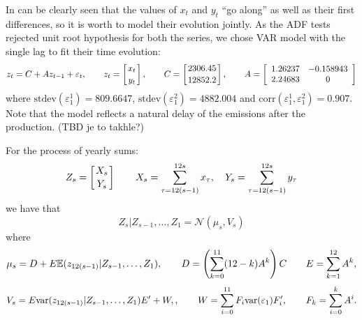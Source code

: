 \documentclass[3p,times]{elsarticle}
\begin{document}
In can be clearly seen that the values of $x_t$ and $y_t$ ``go along'' as well as their first differences, so it is worth to model their evolution jointly. As the ADF tests rejected unit root hypothesis for both the series, we chose VAR model with the single lag to fit their time evolution:
\begin{equation}\label{xymodel}
z_t=C + A z_{t-1} + \varepsilon_t,\qquad 
z_t = \left[x_t \atop y_t\right],
\qquad C = \left[2306	.45\atop 12852.2\right],
\qquad 
A=\left[\begin{array}{cc}
1.26237 &  -0.158943\\
2.24683 & 0 
\end{array}\right]
\end{equation}
where $\mathrm{stdev}(\varepsilon^1_1)=809.6647$, $\mathrm{stdev}(\varepsilon^2_1)=4882.004$ and $\mathrm{corr}(\varepsilon^1_1,\varepsilon^2_1)=0.907$.  Note that the model reflects a natural delay of the emissions after the production. (TBD je to takhle?)

For the process of yearly sums:
$$
Z_s = \left[X_s\atop Y_s\right]
\qquad 
X_s = \sum_{\tau = 12(s-1)}^{12s} x_\tau,
\quad
Y_s =\sum_{\tau = 12(s-1)}^{12s} y_\tau
$$
we have that 
$$
Z_s|Z_{s-1},\dots,Z_1 = \mathcal{N}
\left(\mu_s,V_s\right)
$$
where
$$
\mu_s = D + E\mathbb{E}(z_{12(s-1)}|Z_{s-1},\dots,Z_1),
\qquad 
D 
=\left( \sum_{k=0}^{11} (12-k) A^k\right) C
\qquad 
E = \sum_{k=1}^{12} A^{k},
$$
$$
V_s = E\mathrm{var}(z_{12(s-1)}|Z_{s-1},\dots,Z_1)E'+W,,
\qquad
W = \sum_{i=0}^{11}F_{i}\mathrm{var}(\varepsilon_1)F'_{i},
\qquad 
F_k= \sum_{i=0}^k A^i.
$$
\end{document}
